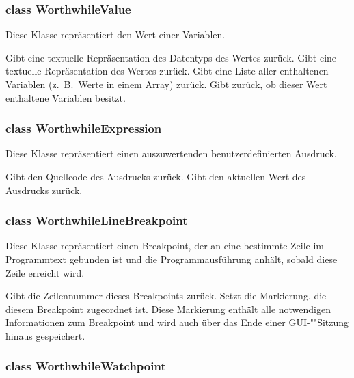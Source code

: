 \subsubsection{class WorthwhileValue}

Diese Klasse repräsentiert den Wert einer Variablen.

\begin{description}
	 Gibt eine textuelle Repräsentation des Datentyps des Wertes zurück.
	 Gibt eine textuelle Repräsentation des Wertes zurück.
	 Gibt eine Liste aller enthaltenen Variablen (z.~B.\ Werte in einem Array) zurück.
	 Gibt zurück, ob dieser Wert enthaltene Variablen besitzt.
\end{description}

\subsubsection{class WorthwhileExpression}

Diese Klasse repräsentiert einen auszuwertenden benutzerdefinierten Ausdruck.

\begin{description}
	 Gibt den Quellcode des Ausdrucks zurück.
	 Gibt den aktuellen Wert des Ausdrucks zurück.
\end{description}

\subsubsection{class WorthwhileLineBreakpoint}

Diese Klasse repräsentiert einen Breakpoint, der an eine bestimmte Zeile im Programmtext gebunden ist und die Programmausführung anhält, sobald diese Zeile erreicht wird.

\begin{description}
	 Gibt die Zeilennummer dieses Breakpoints zurück.
	 Setzt die Markierung, die diesem Breakpoint zugeordnet ist. Diese Markierung enthält alle notwendigen Informationen zum Breakpoint und wird auch über das Ende einer GUI-""Sitzung hinaus gespeichert.
\end{description}

\subsubsection{class WorthwhileWatchpoint}

